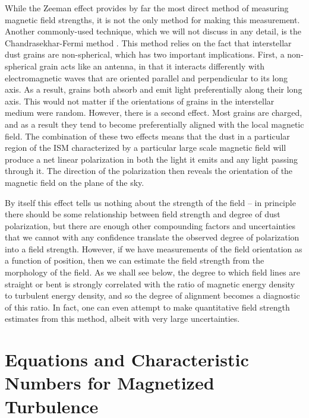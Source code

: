 While the Zeeman effect provides by far the most direct method of measuring magnetic field strengths, it is not the only method for making this measurement. Another commonly-used technique, which we will not discuss in any detail, is the Chandrasekhar-Fermi method \citep{chandrasekhar53a}. This method relies on the fact that interstellar dust grains are non-spherical, which has two important implications. First, a non-spherical grain acts like an antenna, in that it interacts differently with electromagnetic waves that are oriented parallel and perpendicular to its long axis. As a result, grains both absorb and emit light preferentially along their long axis. This would not matter if the orientations of grains in the interstellar medium were random. However, there is a second effect. Most grains are charged, and as a result they tend to become preferentially aligned with the local magnetic field. The combination of these two effects means that the dust in a particular region of the ISM characterized by a particular large scale magnetic field will produce a net linear polarization in both the light it emits and any light passing through it. The direction of the polarization then reveals the orientation of the magnetic field on the plane of the sky.

By itself this effect tells us nothing about the strength of the field -- in principle there should be some relationship between field strength and degree of dust polarization, but there are enough other compounding factors and uncertainties that we cannot with any confidence translate the observed degree of polarization into a field strength. However, if we have measurements of the field orientation as a function of position, then we can estimate the field strength from the morphology of the field. As we shall see below, the degree to which field lines are straight or bent is strongly correlated with the ratio of magnetic energy density to turbulent energy density, and so the degree of alignment becomes a diagnostic of this ratio. In fact, one can even attempt to make quantitative field strength estimates from this method, albeit with very large uncertainties.


\section{Equations and Characteristic Numbers for Magnetized Turbulence}

